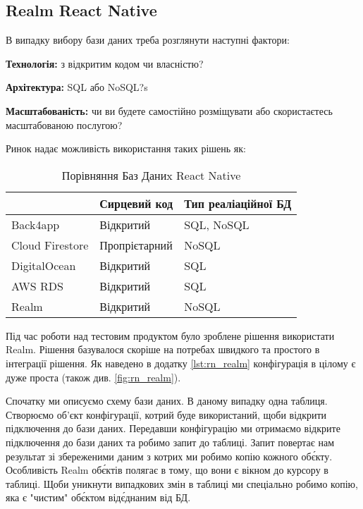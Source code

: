 \subsection{Realm React Native}
\label{subsec:rn_realm}
В випадку вибору бази даних треба розглянути наступні фактори:
\begin{itemize}
    \begin{item}
        \textbf{Технологія:} з відкритим кодом чи власністю?
    \end{item}
    \begin{item}
        \textbf{Архітектура:} SQL або NoSQL?s
    \end{item}
    \begin{item}
        \textbf{Масштабованість:} чи ви будете самостійно розміщувати або скористаєтесь масштабованою послугою?
    \end{item}
\end{itemize}

Ринок надає можливість використання таких рішень як:

\begin{longtable}[c]{|l|l|l|}
    \caption{Порівняння Баз Даниx React Native}
    \label{tab:rn_db_comparison} \\
    \hline
    & Сирцевий код  & Тип реаліаційної БД \\ \hline
    \endhead
%
    Back4app        & Відкритий     & SQL, NoSQL          \\ \hline
    Cloud Firestore & Пропрієтарний & NoSQL               \\ \hline
    DigitalOcean    & Відкритий     & SQL                 \\ \hline
    AWS RDS         & Відкритий     & SQL                 \\ \hline
    Realm           & Відкритий     & NoSQL               \\ \hline
\end{longtable}

Під час роботи над тестовим продуктом було зроблене рішення використати Realm.
Рішення базувалося скоріше на потребах швидкого та простого в інтеграції рішення.
Як наведено в додатку \ref{lst:rn_realm}  конфігурація в цілому є дуже проста (також див. \ref{fig:rn_realm}).

Спочатку ми описуємо схему бази даних. В даному випадку одна таблиця.
Створюємо об'єкт конфігурації, котрий буде використаний, щоби відкрити підключення до бази даних.
Передавши конфігурацію ми отримаємо відкрите підключення до бази даних та робимо запит до таблиці.
Запит повертає нам результат зі збереженими даним з котрих ми робимо копію кожного об\'єкту.
Особливість Realm об\'єктів полягає в тому, що вони є вікном до курсору в таблиці.
Щоби уникнути випадкових змін в таблиці ми спеціально робимо копію, яка є "чистим" об\'єктом від\'єднаним від БД.


